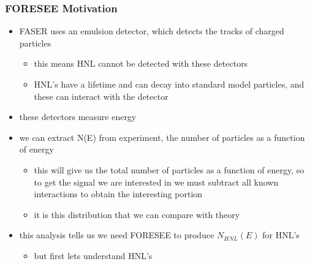 \documentclass[
	11pt, %
]{beamer}
\begin{document}
\begin{frame}
\frametitle{FORESEE Motivation}
	\begin{itemize}
		\item FASER uses an emulsion detector, which detects the tracks of charged particles
			\begin{itemize}
				\item this means HNL cannot be detected with these detectors
				\item HNL's have a lifetime and can decay into standard model particles, and these can interact with the detector
			\end{itemize}
		\item these detectors measure energy 
		\item we can extract N(E) from experiment, the number of particles as a function of energy
			\begin{itemize}
				\item this will give us the total number of particles as a function of energy, so to get the signal we are interested in we must subtract all known interactions to obtain the interesting portion
				\item it is this distribution that we can compare with theory
			\end{itemize}
		\item this analysis tells us we need FORESEE to produce $N_{HNL}(E)$ for HNL's
			\begin{itemize}
				\item but first lets understand HNL's
			\end{itemize}
	\end{itemize}
\end{frame}
\end{document}
